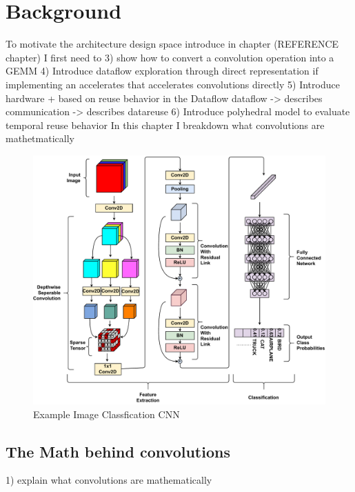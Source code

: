 \chapter{Background}
\label{chap:background:intro}

To motivate the architecture design space introduce in chapter (REFERENCE chapter)
I first need to 
3) show how to convert a convolution operation into a GEMM
4) Introduce dataflow exploration through direct representation if implementing
an accelerates that accelerates convolutions directly
5) Introduce hardware 
+ based on reuse behavior in the Dataflow
dataflow -> describes communication -> describes datareuse
6) Introduce polyhedral model to evaluate temporal reuse behavior
In this chapter I
breakdown what convolutions are mathetmatically



\begin{figure}[ht]
    \centering
    \includegraphics[scale=0.4]{fig/cnn.pdf}
    \caption{Example Image Classfication CNN}
    \label{fig:cnn_network}
\end{figure}

\clearpage

\section{The Math behind convolutions}
\label{chap:intro:conv_operation}

1) explain what convolutions are mathematically

